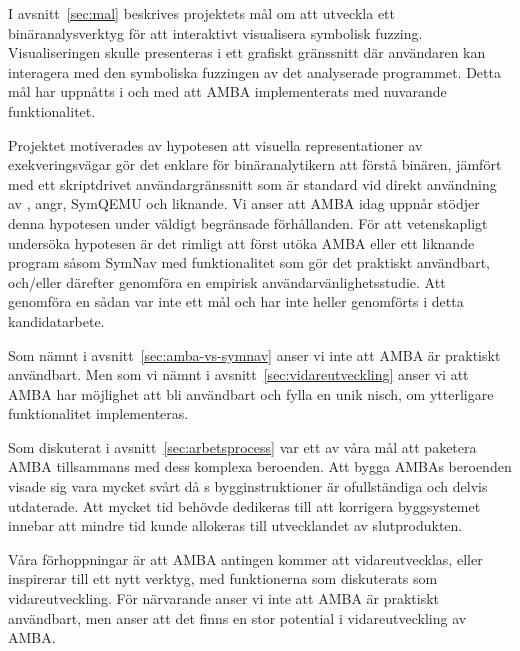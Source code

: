 I avsnitt~\ref{sec:mal} beskrives projektets mål om att utveckla ett
binäranalysverktyg för att interaktivt visualisera symbolisk fuzzing.
Visualiseringen skulle presenteras i ett grafiskt gränssnitt där användaren kan
interagera med den symboliska fuzzingen av det analyserade programmet. Detta mål
har uppnåtts i och med att AMBA implementerats med nuvarande funktionalitet.

Projektet motiverades av hypotesen att visuella representationer av
exekveringsvägar gör det enklare för binäranalytikern att förstå binären,
jämfört med ett skriptdrivet användargränssnitt som är standard vid direkt
användning av \stoe{}, angr, SymQEMU och liknande. Vi anser att AMBA idag uppnår
stödjer denna hypotesen under väldigt begränsade förhållanden. För att
vetenskapligt undersöka hypotesen är det rimligt att först utöka AMBA eller ett
liknande program såsom SymNav med funktionalitet som gör det praktiskt
användbart, och/eller därefter genomföra en empirisk användarvänlighetsstudie.
Att genomföra en sådan var inte ett mål och har inte heller genomförts i detta
kandidatarbete.

Som nämnt i avsnitt~\ref{sec:amba-vs-symnav} anser vi inte att AMBA är praktiskt
användbart. Men som vi nämnt i avsnitt~\ref{sec:vidareutveckling} anser vi att
AMBA har möjlighet att bli användbart och fylla en unik nisch, om ytterligare
funktionalitet implementeras.

Som diskuterat i avsnitt~\ref{sec:arbetsprocess} var ett av våra mål att
paketera AMBA tillsammans med dess komplexa beroenden. Att bygga AMBAs beroenden
visade sig vara mycket svårt då \stoe{}s bygginstruktioner är ofullständiga och
delvis utdaterade. Att mycket tid behövde dedikeras till att korrigera
byggsystemet innebar att mindre tid kunde allokeras till utvecklandet av
slutprodukten.

Våra förhoppningar är att AMBA antingen kommer att vidareutvecklas, eller
inspirerar till ett nytt verktyg, med funktionerna som diskuterats som
vidareutveckling. För närvarande anser vi inte att AMBA är praktiskt användbart,
men anser att det finns en stor potential i vidareutveckling av AMBA.\@
